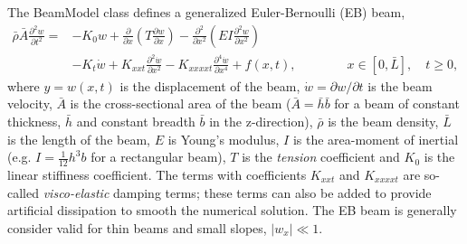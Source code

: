 \documentclass[11pt]{article}
\newcommand{\rhos}{\bar{\rho}}
\newcommand{\hs}{\bar{h}}
\newcommand{\bs}{\bar{b}}
\newcommand{\As}{\bar{A}}
\newcommand{\Ls}{\bar{L}}
\newcommand{\wt}{\dot{w}}
\begin{document}
The BeamModel class defines a generalized Euler-Bernoulli (EB) beam,
\begin{align}
  \rhos \As \frac{\partial^2 w}{\partial t^2} = 
                    & -K_0 w +
                   \frac{\partial}{\partial x}\left( T \frac{\partial w}{\partial x}\right)
                   - \frac{\partial^2}{\partial x^2}\left( E I \frac{\partial^2 w}{\partial x^2}\right) \\
              &    - K_{t} \wt
                   + K_{xxt} \frac{\partial^2 \wt}{\partial x^2}
                   - K_{xxxxt} \frac{\partial^4 \wt}{\partial x^4}
                   + f(x,t), 
                  \qquad\qquad x\in[0,\Ls], \quad t\ge 0,  \label{eq:BeamModel}
\end{align}
where $y=w(x,t)$ is the displacement of the beam, $\wt=\partial w/\partial t$ is the beam velocity,  
$\As$ is the cross-sectional area of the beam ($\As=\hs\bs$ for a beam of constant thickness, $\hs$ and constant breadth $\bs$ in the z-direction), 
$\rhos$ is the beam density, $\Ls$ is the length of the beam, 
$E$ is Young's modulus, $I$ is the area-moment of inertial (e.g. $I=\frac{1}{12} h^3 b$ for a rectangular beam),
 $T$ is the {\em tension} coefficient and $K_0$ is the linear stiffiness coefficient.
The terms with coefficients $K_{xxt}$ and $K_{xxxxt}$ are so-called {\em visco-elastic} damping terms;
these terms can also be added to provide artificial dissipation to smooth the numerical solution.  
% 
The EB beam is generally consider valid for thin beams and small slopes,  $|w_x| \ll 1$.
\end{document}

